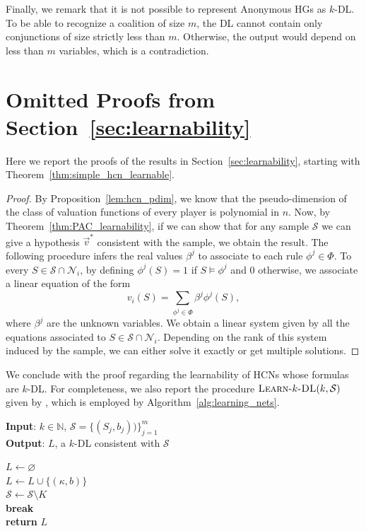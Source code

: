 \documentclass[letterpaper]{article} %
\newcommand{\sample}{\ensuremath{\mathcal{S}}}
\newcommand{\learnkDL}{\textsc{Learn-}k\textsc{-DL}}
\begin{document}
Finally, we remark that it is not possible to represent Anonymous HGs as $k$-DL. To be able to recognize a coalition of size $m$, the DL cannot contain only conjunctions of size strictly less than $m$. Otherwise, the output would depend on less than $m$ variables, which is a contradiction.
%

\section{Omitted Proofs from Section~\ref{sec:learnability}}\label{apx:learnability}
Here we report the proofs of the results in Section~\ref{sec:learnability}, starting with Theorem~\ref{thm:simple_hcn_learnable}.
\simpleHCNLearnable*
\begin{proof}
By Proposition~\ref{lem:hcn_pdim}, we know that the pseudo-dimension of the class of valuation functions of every player is polynomial in $n$.
%
Now, by Theorem~\ref{thm:PAC_learnability}, if we can show that for any sample $\sample$ we can give a hypothesis $\vec{v}^*$ consistent with the sample, we obtain the result. The following procedure infers the real values $\beta^j$ to associate to each rule $\phi^j \in \Phi$. To every $S \in \sample\cap \mathcal{N}_i$, by defining $\phi^j(S)=1$ if $S\models\phi^j$ and $0$ otherwise, we associate a linear equation of the form
\begin{equation*}
    v_i(S)=\sum_{\phi^j \in \Phi} \beta^j \phi^j(S),
\end{equation*}
where $\beta^j$ are the unknown variables. We obtain a linear system given by all the equations associated to $S \in \sample\cap \mathcal{N}_i$. Depending on the rank of this system induced by the sample, we can either solve it exactly or get multiple solutions.
\end{proof}

We conclude with the proof regarding the learnability of HCNs whose formulas are $k$-DL. For completeness, we also report the procedure $\learnkDL(k,\sample)$ given by \citet{Rivest87}, which is employed by Algorithm~\ref{alg:learning_nets}.

\begin{algorithm}[htb]
\caption{\learnkDL~\cite{Rivest87}}\label{alg:learning_kDL}
\textbf{Input}: $k \in \mathbb{N}$, $\mathcal{S}=\{( S_j,b_j))\}_{j=1}^m$\\
\textbf{Output}: $L$, a $k$-DL consistent with $\sample$

\begin{algorithmic}[1] %
\STATE $L \gets \varnothing$\\
\WHILE{$\sample \neq \varnothing$}
\IF{every set in $K = \{S \in \sample : S \models \kappa\}$ has the same label $b$}
\STATE $L \gets L \cup \{(\kappa, b)\}$\\
\STATE $\sample \gets \sample \setminus K$\\
\ENDIF
\STATE \textbf{break}\\
\ENDFOR
\ENDWHILE
\STATE \textbf{return} $L$\\
\end{algorithmic}
\end{algorithm}
\end{document}
